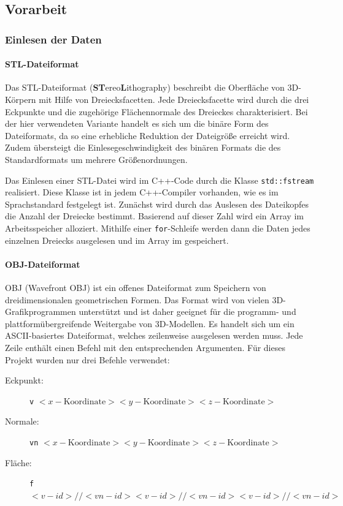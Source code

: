 \documentclass[crop=false]{standalone}
\begin{document}
    \subsection{Vorarbeit} %
    \label{sub:vorarbeit}

      \subsubsection{Einlesen der Daten} %
      \label{ssub:einlesen_der_daten}
        \paragraph{STL-Dateiformat}
        Das STL-Dateiformat (\textbf{ST}ereo\textbf{L}ithography) beschreibt die Oberfläche von 3D-Körpern mit Hilfe von Dreiecksfacetten.
        Jede Dreiecksfacette wird durch die drei Eckpunkte und die zugehörige Flächennormale des Dreieckes charakterisiert.
        Bei der hier verwendeten Variante handelt es sich um die binäre Form des Dateiformats, da so eine erhebliche Reduktion der Dateigröße erreicht wird.
        Zudem übersteigt die Einlesegeschwindigkeit des binären Formats die des Standardformats um mehrere Größenordnungen.

        Das Einlesen einer STL-Datei wird im C++-Code durch die Klasse \texttt{std::fstream} realisiert.
        Diese Klasse ist in jedem C++-Compiler vorhanden, wie es im Sprachstandard festgelegt ist.
        Zunächst wird durch das Auslesen des Dateikopfes die Anzahl der Dreiecke bestimmt.
        Basierend auf dieser Zahl wird ein Array im Arbeitsspeicher alloziert.
        Mithilfe einer \texttt{for}-Schleife werden dann die Daten jedes einzelnen Dreiecks ausgelesen und im Array im gespeichert.


        \paragraph{OBJ-Dateiformat}
        OBJ (Wavefront OBJ) ist ein offenes Dateiformat zum Speichern von dreidimensionalen geometrischen Formen.
        Das Format wird von vielen 3D-Grafikprogrammen unterstützt und ist daher geeignet für die programm- und plattformübergreifende Weitergabe von 3D-Modellen.
        Es handelt sich um ein ASCII-basiertes Dateiformat, welches zeilenweise ausgelesen werden muss.
        Jede Zeile enthält einen Befehl mit den entsprechenden Argumenten.
        Für dieses Projekt wurden nur drei Befehle verwendet:
        \begin{description}
          \item[Eckpunkt:] \texttt{v} $<x-\mathrm{Koordinate}> <y-\mathrm{Koordinate}> <z-\mathrm{Koordinate}>$
          \item[Normale:]
            \texttt{vn} $<x-\mathrm{Koordinate}> <y-\mathrm{Koordinate}> <z-\mathrm{Koordinate}>$
          \item[Fläche:]
            \texttt{f} $<v-id>//<vn-id> <v-id>//<vn-id> <v-id>//<vn-id>$
        \end{description}
\end{document}
